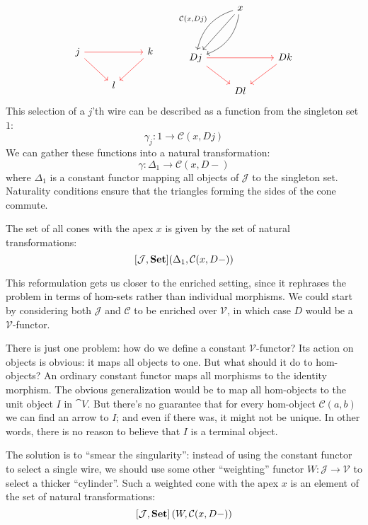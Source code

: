 \documentclass[DaoFP]{subfiles}
\begin{document}
\[
 \begin{tikzcd}
 \\
 \\
j
\arrow[rr, red]
\arrow[rd, red]
&& k
\arrow[dl, red]
\\
& l
 \end{tikzcd}
 \qquad
 \begin{tikzcd}
  & x
 \arrow[ddl, ""']
 \arrow[ddl, bend right, "{\mathcal C(x, D j)}"']
 \arrow[ddl, bend left, ""]
 \\
\\
D j
\arrow[rr, red]
\arrow[rd, red]
&& D k
\arrow[dl, red]
\\
& D l
 \end{tikzcd}
 \]
This selection of a $j$'th wire can be described as a function from the singleton set $1$:
\[ \gamma_j \colon 1 \to \mathcal C(x, D j) \]
We can gather these functions into a natural transformation:
\[ \gamma \colon \Delta_1 \to \mathcal C(x, D -) \]
where $\Delta_1$ is a constant functor mapping all objects of $\mathcal J$ to the singleton set. Naturality conditions ensure that the triangles forming the sides of the cone commute. 

The set of all cones  with the apex $x$ is given by the set of natural transformations:
\[ [\mathcal J, \mathbf{Set}] (\Delta_1, \mathcal C(x, D-)) \]

This reformulation gets us closer to the enriched setting, since it rephrases the problem in terms of hom-sets rather than individual morphisms. We could start by considering both $\mathcal J$ and $\mathcal C$ to be enriched over $\mathcal V$, in which case $D$ would be a $\mathcal V$-functor. 

There is just one problem: how do we define a constant $\mathcal V$-functor? Its action on objects is obvious: it maps all objects to one. But what should it do to hom-objects? An ordinary constant functor maps all morphisms to the identity morphism. The obvious generalization would be to map all hom-objects to the unit object $I$ in $\cat V$. But there's no guarantee that for every hom-object $\mathcal C(a, b)$ we can find an arrow to $I$; and even if there was, it might not be unique. In other words, there is no reason to believe that $I$ is a terminal object.

The solution is to ``smear the singularity'': instead of using the constant functor to select a single wire, we should use some other ``weighting'' functor $W \colon \mathcal J\to \mathcal V$ to select a thicker ``cylinder''. Such a weighted cone with the apex $x$ is an element of the set of natural transformations:
\[ [\mathcal J, \mathbf{Set}] \left(W, \mathcal C(x, D-)\right) \]
\end{document}
